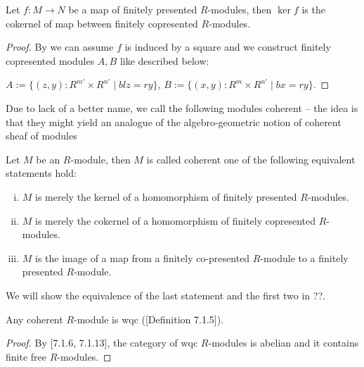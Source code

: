 \begin{lemma}
  \label{kernel-fp-is-cok-fcp}       
  Let $f:M\to N$ be a map of finitely presented $R$-modules, then $\ker f$ is the cokernel of map between finitely copresented $R$-modules.
\end{lemma}

\begin{proof}
  By  we can assume $f$ is induced by a square and we construct finitely copresented modules $A,B$ like described below:
  \begin{center}
   \end{center}
   $A:=\{(z,y):R^{m'}\times R^{n'}\mid blz=ry\}$, $B:=\{(x,y):R^{m}\times R^{n'}\mid bx=ry\}$.
\end{proof}

Due to lack of a better name, we call the following modules coherent --
the idea is that they might yield an analogue of the algebro-geometric notion of coherent sheaf of modules

\begin{definition}
  Let $M$ be an $R$-module, then $M$ is called coherent one of the following equivalent statements hold:
  \begin{enumerate}[(i)]
  \item $M$ is merely the kernel of a homomorphism of finitely presented $R$-modules.
  \item $M$ is merely the cokernel of a homomorphism of finitely copresented $R$-modules.
  \item $M$ is the image of a map from a finitely co-presented $R$-module to a finitely presented $R$-module.
  \end{enumerate}
\end{definition}
We will show the equivalence of the last statement and the first two in ??.

\begin{remark}
  Any coherent $R$-module is wqc (\cite{draft}[Definition 7.1.5]).
\end{remark}

\begin{proof}
  By \cite{draft}[7.1.6, 7.1.13], the category of wqc $R$-modules is abelian and it contains finite free $R$-modules.
\end{proof}

